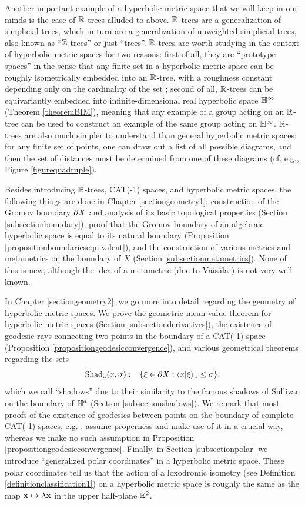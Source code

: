 Another important example of a hyperbolic metric space that we will keep in our minds is the case of $\R$-trees alluded to above. $\R$-trees are a generalization of simplicial trees, which in turn are a generalization of unweighted simplicial trees, also known as ``$\Z$-trees'' or just ``trees''. $\R$-trees are worth studying in the context of hyperbolic metric spaces for two reasons: first of all, they are ``prototype spaces'' in the sense that any finite set in a hyperbolic metric space can be roughly isometrically embedded into an $\R$-tree, with a roughness constant depending only on the cardinality of the set \cite[pp.33-38]{GhysHarpe1}; second of all, $\R$-trees can be equivariantly embedded into infinite-dimensional real hyperbolic space $\H^\infty$ (Theorem \ref{theoremBIM}), meaning that any example of a group acting on an $\R$-tree can be used to construct an example of the same group acting on $\H^\infty$. $\R$-trees are also much simpler to understand than general hyperbolic metric spaces: for any finite set of points, one can draw out a list of all possible diagrams, and then the set of distances must be determined from one of these diagrams (cf. e.g., Figure \ref{figurequadruple}).

Besides introducing $\R$-trees, CAT(-1) spaces, and hyperbolic metric spaces, the following things are done in Chapter \ref{sectiongeometry1}: construction of the Gromov boundary $\partial X$ and analysis of its basic topological properties (Section \ref{subsectionboundary}), proof that the Gromov boundary of an algebraic hyperbolic space is equal to its natural boundary (Proposition \ref{propositionboundariesequivalent}), and the construction of various metrics and metametrics on the boundary of $X$ (Section \ref{subsectionmetametrics}). None of this is new, although the idea of a metametric (due to V\"ais\"al\"a \cite[]{Vaisala}) is not very well known.

In Chapter \ref{sectiongeometry2}, we go more into detail regarding the geometry of hyperbolic metric spaces. We prove the geometric mean value theorem for hyperbolic metric spaces (Section \ref{subsectionderivatives}), the existence of geodesic rays connecting two points in the boundary of a CAT(-1) space (Proposition \ref{propositiongeodesicconvergence}), and various geometrical theorems regarding the sets
\[
\operatorname{Shad}_z(x,\sigma) := \{\xi\in\partial X : \langle x|\xi\rangle_z \leq \sigma\},
\]
which we call ``shadows'' due to their similarity to the famous shadows of Sullivan \cite[Fig. 2]{Sullivan_density_at_infinity} on the boundary of $\H^d$ (Section \ref{subsectionshadows}). We remark that most proofs of the existence of geodesics between points on the boundary of complete CAT(-1) spaces, e.g. \cite[Proposition II.9.32]{BridsonHaefliger}, assume properness and make use of it in a crucial way, whereas we make no such assumption in Proposition \ref{propositiongeodesicconvergence}. Finally, in Section \ref{subsectionpolar} we introduce ``generalized polar coordinates'' in a hyperbolic metric space. These polar coordinates tell us that the action of a loxodromic isometry (see Definition \ref{definitionclassification1}) on a hyperbolic metric space is roughly the same as the map $\mathbf x\mapsto \lambda\mathbf x$ in the upper half-plane $\E^2$.

